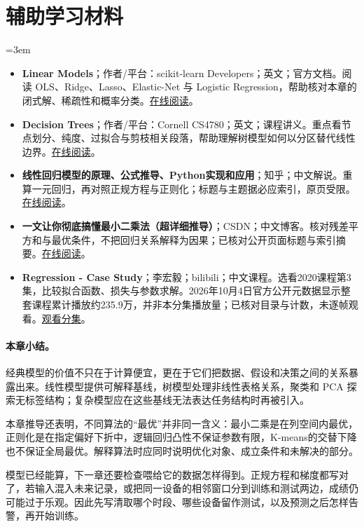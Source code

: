 \section*{辅助学习材料}
\begingroup
\emergencystretch=3em
\begin{itemize}
\item \textbf{Linear Models}；作者/平台：scikit-learn Developers；英文；官方文档。阅读 OLS、Ridge、Lasso、Elastic-Net 与 Logistic Regression，帮助核对本章的闭式解、稀疏性和概率分类。\href{https://scikit-learn.org/stable/modules/linear\_model.html}{在线阅读}。
\item \textbf{Decision Trees}；作者/平台：Cornell CS4780；英文；课程讲义。重点看节点划分、纯度、过拟合与剪枝相关段落，帮助理解树模型如何以分区替代线性边界。\href{https://www.cs.cornell.edu/courses/cs4780/2018fa/lectures/lecturenote17.html}{在线阅读}。
\item \textbf{线性回归模型的原理、公式推导、Python实现和应用}；知乎；中文解说。重算一元回归，再对照正规方程与正则化；标题与主题据必应索引，原页受限。\href{https://zhuanlan.zhihu.com/p/80887841}{在线阅读}。
\item \textbf{一文让你彻底搞懂最小二乘法（超详细推导）}；CSDN；中文博客。核对残差平方和与最优条件，不把回归关系解释为因果；已核对公开页面标题与索引摘要。\href{https://blog.csdn.net/MoreAction\_/article/details/106443383}{在线阅读}。
\item \textbf{Regression - Case Study}；李宏毅；bilibili；中文课程。选看2020课程第3集，比较拟合函数、损失与参数求解。2026年10月4日官方公开元数据显示整套课程累计播放约235.9万，并非本分集播放量；已核对目录与计数，未逐帧观看。\href{https://www.bilibili.com/video/BV1JE411g7XF/?p=3}{观看分集}。
\end{itemize}
\endgroup
\paragraph{本章小结。}
经典模型的价值不只在于计算便宜，更在于它们把数据、假设和决策之间的关系暴露出来。线性模型提供可解释基线，树模型处理非线性表格关系，聚类和 PCA 探索无标签结构；复杂模型应在这些基线无法表达任务结构时再被引入。

本章推导还表明，不同算法的“最优”并非同一含义：最小二乘是在列空间内最优，正则化是在指定偏好下折中，逻辑回归凸性不保证参数有限，K-means的交替下降也不保证全局最优。解释算法时应同时说明优化对象、成立条件和未解决的部分。

模型已经能算，下一章还要检查喂给它的数据怎样得到。正规方程和梯度都写对了，若输入混入未来记录，或把同一设备的相邻窗口分到训练和测试两边，成绩仍可能过于乐观。因此先写清取哪个时段、哪些设备留作测试，以及预测之后怎样告警，再开始训练。
